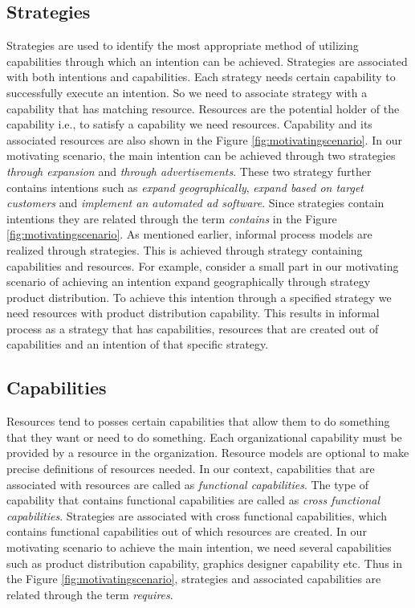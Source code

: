 \subsection{Strategies} 
\label{sec:strategies}
Strategies are used to identify the most appropriate method of utilizing capabilities through which an intention can be achieved. Strategies are associated with both intentions and capabilities. Each strategy needs certain capability to successfully execute an intention. So we need to associate strategy with a capability that has matching resource. Resources are the potential holder of the capability i.e., to satisfy a capability we need resources. Capability and its associated resources are also shown in the Figure \ref{fig:motivatingscenario}. In our motivating scenario, the main intention can be achieved through two strategies \textit{through expansion} and \textit{through advertisements}. These two strategy further contains intentions such as \textit{expand geographically}, \textit{expand based on target customers} and \textit{implement an automated ad software}. Since strategies contain intentions they are related through the term \textit{contains} in the Figure \ref{fig:motivatingscenario}. As mentioned earlier, informal process models are realized through strategies. This is achieved through strategy containing capabilities and resources. For example, consider a small part in our motivating scenario of achieving an intention expand geographically through strategy product distribution. To achieve this intention through a specified strategy we need resources with product distribution capability. This results in informal process as a strategy that has capabilities, resources that are created out of capabilities and an intention of that specific strategy.

\subsection{Capabilities}
\label{sec:capabilities}
Resources tend to posses certain capabilities that allow them to do something that they want or need to do something. Each organizational capability must be provided by a resource in the organization. Resource models are optional \cite{Sungur2015b} to make precise definitions of resources needed. In our context, capabilities that are associated with resources are called as \textit{functional capabilities}. The type of capability that contains functional capabilities are called as \textit{cross functional capabilities}. Strategies are associated with cross functional capabilities, which contains functional capabilities out of which resources are created. In our motivating scenario to achieve the main intention, we need several capabilities such as product distribution capability, graphics designer capability etc. Thus in the Figure \ref{fig:motivatingscenario}, strategies and associated capabilities are related through the term \textit{requires}. 

